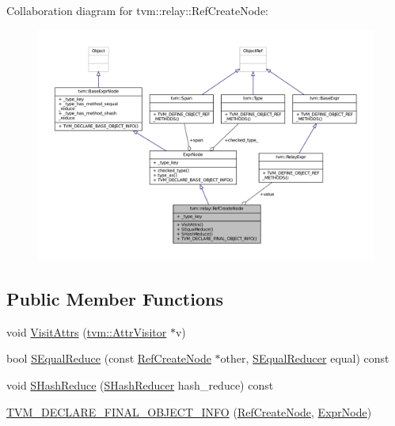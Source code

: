 Collaboration diagram for tvm\+:\+:relay\+:\+:Ref\+Create\+Node\+:
\nopagebreak
\begin{figure}[H]
\begin{center}
\leavevmode
\includegraphics[width=350pt]{classtvm_1_1relay_1_1RefCreateNode__coll__graph}
\end{center}
\end{figure}
\subsection*{Public Member Functions}
\begin{DoxyCompactItemize}
\item 
void \hyperlink{classtvm_1_1relay_1_1RefCreateNode_aea446a8f5f1a363f0669d90b6668d624}{Visit\+Attrs} (\hyperlink{classtvm_1_1AttrVisitor}{tvm\+::\+Attr\+Visitor} $\ast$v)
\item 
bool \hyperlink{classtvm_1_1relay_1_1RefCreateNode_a590fff169df1f7d541b03fc94c3b4cdc}{S\+Equal\+Reduce} (const \hyperlink{classtvm_1_1relay_1_1RefCreateNode}{Ref\+Create\+Node} $\ast$other, \hyperlink{classtvm_1_1SEqualReducer}{S\+Equal\+Reducer} equal) const 
\item 
void \hyperlink{classtvm_1_1relay_1_1RefCreateNode_a677835cf083965c21f0bf0644d74d011}{S\+Hash\+Reduce} (\hyperlink{classtvm_1_1SHashReducer}{S\+Hash\+Reducer} hash\+\_\+reduce) const 
\item 
\hyperlink{classtvm_1_1relay_1_1RefCreateNode_a9a26c27250a77ef06b06c73766695df4}{T\+V\+M\+\_\+\+D\+E\+C\+L\+A\+R\+E\+\_\+\+F\+I\+N\+A\+L\+\_\+\+O\+B\+J\+E\+C\+T\+\_\+\+I\+N\+FO} (\hyperlink{classtvm_1_1relay_1_1RefCreateNode}{Ref\+Create\+Node}, \hyperlink{namespacetvm_1_1relay_a387f18e050d016c52ea6c4781e7cff6c}{Expr\+Node})
\end{DoxyCompactItemize}
